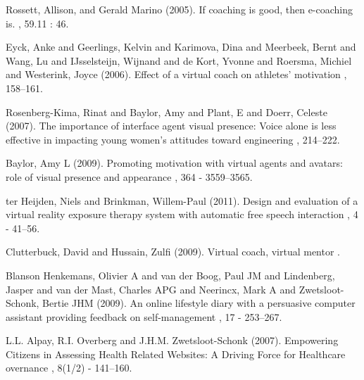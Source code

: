\documentclass[twoside]{article}
\begin{document}
\begin{multicols}{2}
\begin{thebibliography}{99}


Rossett, Allison, and Gerald Marino (2005).
\newblock If coaching is good, then e-coaching is.
, 59.11 : 46.

Eyck, Anke and Geerlings, Kelvin and Karimova, Dina and Meerbeek, Bernt and Wang, Lu and IJsselsteijn, Wijnand and de Kort, Yvonne and Roersma, Michiel and Westerink, Joyce (2006).
\newblock Effect of a virtual coach on athletes’ motivation
, 158--161.


Rosenberg-Kima, Rinat and Baylor, Amy and Plant, E and Doerr, Celeste (2007).
\newblock The importance of interface agent visual presence: Voice alone is less effective in impacting young women’s attitudes toward engineering
, 214--222.


Baylor, Amy L (2009).
\newblock Promoting motivation with virtual agents and avatars: role of visual presence and appearance
, 364 - 3559--3565.


ter Heijden, Niels and Brinkman, Willem-Paul (2011).
\newblock Design and evaluation of a virtual reality exposure therapy system with automatic free speech interaction
, 4 - 41--56.


Clutterbuck, David and Hussain, Zulfi (2009).
\newblock Virtual coach, virtual mentor
.


Blanson Henkemans, Olivier A and van der Boog, Paul JM and Lindenberg, Jasper and van der Mast, Charles APG and Neerincx, Mark A and Zwetsloot-Schonk, Bertie JHM (2009).
\newblock An online lifestyle diary with a persuasive computer assistant providing feedback on self-management
, 17 - 253--267.


L.L. Alpay, R.I. Overberg and J.H.M. Zwetsloot-Schonk (2007).
\newblock Empowering Citizens in Assessing Health Related Websites: A Driving Force for Healthcare overnance
, 8(1/2) - 141--160.


\end{thebibliography}
\end{multicols}
\end{document}
